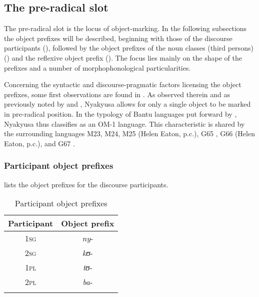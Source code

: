 \subsection{The pre-radical slot}
\label{ObjectConcords} 
The pre-radical slot is the locus of object-marking. In the following subsections the object prefixes will be described, beginning with those of the discourse participants (), followed by the object prefixes of the noun classes (third persons) () and the reflexive object prefix (). The focus lies mainly on the shape of the prefixes and a number of morphophonological particularities.

Concerning the syntactic and discourse-pragmatic factors licensing the object prefixes, some first observations are found in \citet{LusekeloA2012}. As observed therein and as previously noted by \citet[20f]{SchumannK1899} and \citet[17--20]{EndemannC1914}, Nyakyusa allows for only a single object to be marked in pre-radical position. In the typology of Bantu languages put forward by \citet{BearthT2003}, Nyakyusa thus classifies as an OM-1 language. This characteristic is shared by the surrounding languages  M23,  M24,  M25 (Helen Eaton, p.c.),  G65 \citep{WolffR1905},  G66 (Helen Eaton, p.c.), and  G67 \citep{GrayMS}.
\subsubsection{Participant object prefixes}
\label{sectionParticipantOM}
 lists the object prefixes for the discourse participants. 
\begin{table}[H] 
	\begin{center}
		\begin{tabular}{cc}
			\lsptoprule 
			\footnotesize{Participant} & \footnotesize{Object prefix} \\ 
			\midrule 
			1\textsc{sg} & \textit{ny}- \\ 
			2\textsc{sg} & \textit{kʊ}- \\ 
			1\textsc{pl} & \textit{tʊ}- \\ 
			2\textsc{pl} & \textit{ba}-\\
			\lspbottomrule 
		\end{tabular} 
	\caption{Participant object prefixes}
	\label{OMparticipants}
	\end{center}
\end{table}

